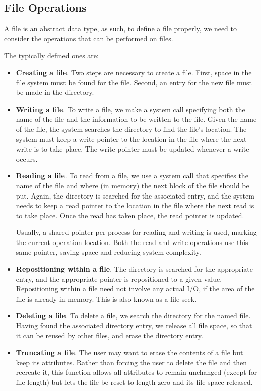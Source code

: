 \subsection{File Operations}\label{subsec:File_Operations}
A file is an abstract data type, as such, to define a file properly, we need to consider the operations that can be performed on files.

The typically defined ones are:
\begin{itemize}[noitemsep]
\item \textbf{Creating a file}.
  Two steps are necessary to create a file.
  First, space in the file system must be found for the file.
  Second, an entry for the new file must be made in the directory.

\item \textbf{Writing a file}.
  To write a file, we make a system call specifying both the name of the file and the information to be written to the file.
  Given the name of the file, the system searches the directory to find the file’s location.
  The system must keep a write pointer to the location in the file where the next write is to take place.
  The write pointer must be updated whenever a write occurs.

\item \textbf{Reading a file}.
  To read from a file, we use a system call that specifies the name of the file and where (in memory) the next block of the file should be put.
  Again, the directory is searched for the associated entry, and the system needs to keep a read pointer to the location in the file where the next read is to take place.
  Once the read has taken place, the read pointer is updated.

  Usually, a shared pointer per-process for reading and writing is used, marking the current operation location.
  Both the read and write operations use this same pointer, saving space and reducing system complexity.

\item \textbf{Repositioning within a file}.
  The directory is searched for the appropriate entry, and the appropriate pointer is repositioned to a given value.
  Repositioning within a file need not involve any actual I/O, if the area of the file is already in memory.
  This is also known as a file seek.

\item \textbf{Deleting a file}.
  To delete a file, we search the directory for the named file.
  Having found the associated directory entry, we release all file space, so that it can be reused by other files, and erase the directory entry.

\item \textbf{Truncating a file}.
  The user may want to erase the contents of a file but keep its attributes.
  Rather than forcing the user to delete the file and then recreate it, this function allows all attributes to remain unchanged (except for file length) but lets the file be reset to length zero and its file space released.
\end{itemize}

